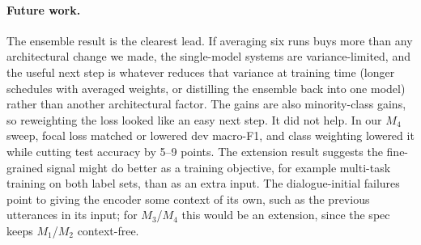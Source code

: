 \documentclass[sigconf,nonacm]{acmart}
\begin{document}
\paragraph{Future work.}
The ensemble result is the clearest lead. If averaging six runs buys more than any
architectural change we made, the single-model systems are variance-limited, and the useful
next step is whatever reduces that variance at training time (longer schedules with
averaged weights, or distilling the ensemble back into one model) rather than another
architectural factor. The gains are also minority-class gains, so reweighting the loss
looked like an easy next step. It did not help. In our $M_4$ sweep, focal loss matched or lowered dev macro-F1, and
class weighting lowered it while cutting test accuracy by 5--9 points. The extension result suggests the
fine-grained signal might do better as a training objective, for example multi-task
training on both label sets, than as an extra input. The dialogue-initial failures point
to giving the encoder some context of its own, such as the previous utterances in its
input; for $M_3$/$M_4$ this would be an extension, since the spec keeps $M_1$/$M_2$
context-free.

\balance


\end{document}
